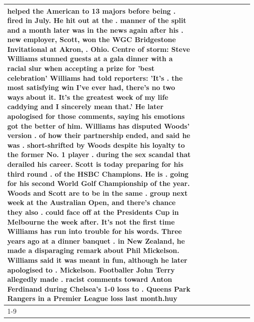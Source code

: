 \begin{table}[H]
\begin{tabular}{lllrlllll}
helped the American to 13 majors before being . fired in July. He hit out at the . manner of the split and a month later was in the news again after his . new employer, Scott, won the WGC Bridgestone Invitational at Akron, . Ohio. Centre of storm: Steve Williams stunned guests at a gala dinner with a racial slur when accepting a prize for 'best celebration' Williams had told reporters: 'It's . the most satisfying win I've ever had, there's no two ways about it. It's the greatest week of my life caddying and I sincerely mean that.' He later apologised for those comments, saying his emotions got the better of him. Williams has disputed Woods' version . of how their partnership ended, and said he was . short-shrifted by Woods despite his loyalty to the former No. 1 player . during the sex scandal that derailed his career. Scott is today preparing for his third round . of the HSBC Champions. He is . going for his second World Golf Championship of the year. Woods and Scott are to be in the same . group next week at the Australian Open, and there's chance they also . could face off at the Presidents Cup in Melbourne the week after. It's not the first time Williams has run into trouble for his words. Three years ago at a dinner banquet . in New Zealand, he made a disparaging remark about Phil Mickelson. Williams said it was meant in fun, although he later apologised to . Mickelson. Footballer John Terry allegedly made . racist comments toward Anton Ferdinand during Chelsea's 1-0 loss to . Queens Park Rangers in a Premier League loss last month.huy \\
\cline{1-9}

\end{tabular}
\end{table}
